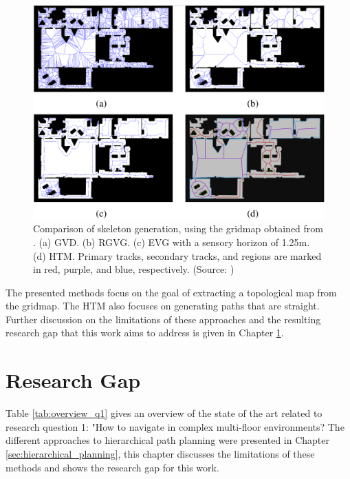 \begin{figure}[h]
    \centering
    \includegraphics[width=\textwidth]{figures/20_state_of_the_art/htm_global_comparison.png}
    \caption[Comparison of generated topological maps]{Comparison of skeleton generation, using the gridmap obtained from \cite{beeson_towards_2005}. (a) GVD. (b) RGVG. (c) EVG with a sensory horizon of 1.25m. (d) HTM. Primary tracks, secondary tracks, and regions are marked in red, purple, and blue, respectively. (Source: \cite{hou_straight_2021})}
    \label{fig:htm_global_comparison}
\end{figure}

The presented methods focus on the goal of extracting a topological map from the gridmap. The HTM also focuses on generating paths that are straight. Further discussion on the limitations of these approaches and the resulting research gap that this work aims to address is given in Chapter \ref{sec:research_gap}. 

\section{Research Gap}
\label{sec:research_gap}
Table \ref{tab:overview_q1} gives an overview of the state of the art related to research question 1: "How to navigate in complex multi-floor environments? The different approaches to hierarchical path planning were presented in Chapter \ref{sec:hierarchical_planning}, this chapter discusses the limitations of these methods and shows the research gap for this work.

